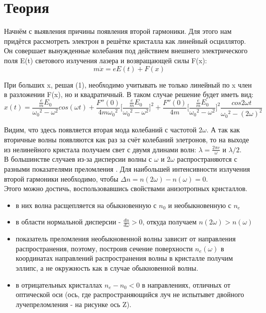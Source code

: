 \documentclass[a4paper,14pt]{article} %
\begin{document}


\newpage

\section{Теория}
Начнём с выявления причины появления второй гармоники. Для этого нам придётся рассмотреть электрон в решётке кристалла как линейный осциллятор. Он совершает вынужденные колебания под действием внешнего электрического поля E(t) светового излучения лазера и возвращающей силы F(x):\\
\begin{equation}
m \ddot{x} = e E(t) + F(x)
\end{equation}

При больших x, решая (1), необходимо учитывать не только линейный по x член в разложении F(x), но и квадратичный. В таком случае решение будет иметь вид:
\begin{equation}
x(t) = \frac{\frac{e}{m} E_0}{{\omega_0}^2 - {\omega}^2} cos(\omega t) 
+ \frac{F''(0)}{4m {\omega_0}^2} \Big[\frac{\frac{e}{m} E_0}{{\omega_0}^2 - {\omega}^2}\Big]^2
+ \frac{F''(0)}{4m} \Big[\frac{\frac{e}{m} E_0}{{\omega_0}^2 - {\omega}^2}\Big]^2
\frac{cos2\omega t}{{\omega_0}^2 - (2 \omega)^2}
\end{equation}

Видим, что здесь появляется вторая мода колебаний с частотой $2 \omega$. А так как вторичные волны появляются как раз за счёт колебаний элетронов, то на выходе из нелинейного кристала получаем свет с двумя длинами волн: $\lambda = \frac{2 \pi c}{\omega}$ и $\lambda / 2$.\\

В большинстве случаев из-за дисперсии волны с $\omega$ и $2 \omega$ распространяются с разными показателями преломления . Для наибольшей интенсивности излучения второй гармоники необходимо, чтобы $\Delta n = n(2 \omega) - n(\omega) = 0$.\\

Этого можно достичь, воспользовавшись свойствами анизотропных кристаллов.
\begin{itemize}
\item в них волна расщепляется на обыкновенную с $n_0$ и необыкновенную с $n_e$
\item в области нормальной дисперсии - $\frac{dn}{d \omega} > 0$, откуда получаем $n(2 \omega) > n(\omega)$
\item показатель преломления необыкновенной волны зависит от направления распространения, поэтому, построив сечение поверхности $n_e(\omega)$ в координатах направлений распространения волны в кристалле получим эллипс, а не окружность как в случае обыкновенной волны.
\item в отрицательных кристаллах $n_e - n_0 < 0$ в направлениях, отличных от оптической оси (ось, где распространяющийся луч не испытывет двойного лучепреломления - на рисунке ось Z).
\end{itemize}
\end{document}
